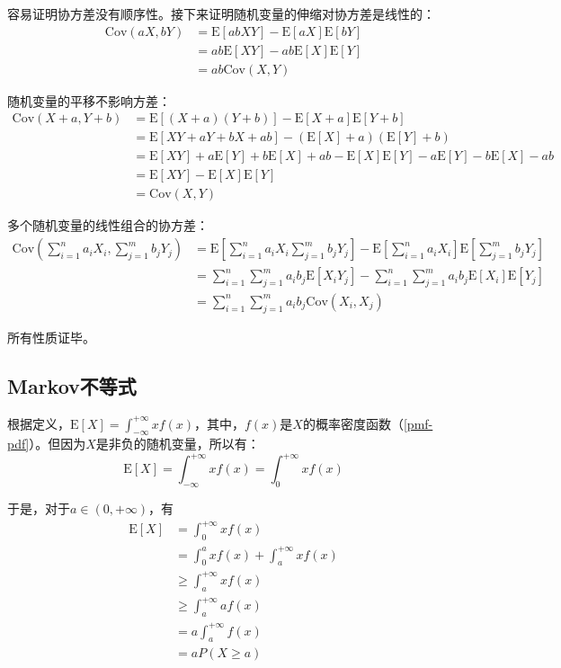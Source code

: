 \documentclass[UTF8]{ctexbook}
\begin{document}
容易证明协方差没有顺序性。接下来证明随机变量的伸缩对协方差是线性的：
\begin{align*}
	\mathrm{Cov}(aX,bY)&=\mathrm E[abXY]-\mathrm E[aX]\mathrm E[bY] \\
	&=ab\mathrm E[XY]-ab\mathrm E[X]\mathrm E[Y] \\
	&=ab\mathrm{Cov}(X, Y)
\end{align*}

随机变量的平移不影响方差：
\begin{align*}
	\mathrm{Cov}(X+a,Y+b)&=\mathrm E[(X+a)(Y+b)]-\mathrm E[X+a]\mathrm E[Y+b] \\
	&=\mathrm E[XY+aY+bX+ab]-(\mathrm E[X]+a)(\mathrm E[Y]+b) \\
	&=\mathrm E[XY]+a\mathrm E[Y]+b\mathrm E[X]+ab-\mathrm E[X]\mathrm E[Y]-a\mathrm E[Y]-b\mathrm E[X]-ab \\
	&=\mathrm E[XY]-\mathrm E[X]\mathrm E[Y] \\
	&=\mathrm{Cov}(X, Y)
\end{align*}

多个随机变量的线性组合的协方差：
\begin{align*}
	\mathrm{Cov}(\sum_{i=1}^na_iX_i, \sum_{j=1}^mb_jY_j)&=\mathrm E[\sum_{i=1}^na_iX_i\sum_{j=1}^mb_jY_j]-\mathrm E[\sum_{i=1}^na_iX_i]\mathrm E[\sum_{j=1}^mb_jY_j] \\
	&=\sum_{i=1}^n\sum_{j=1}^ma_ib_j\mathrm E[X_iY_j]-\sum_{i=1}^n\sum_{j=1}^ma_ib_j\mathrm E[X_i]\mathrm E[Y_j] \\
	&=\sum_{i=1}^n\sum_{j=1}^ma_ib_j\mathrm{Cov}(X_i,X_j)
\end{align*}

所有性质证毕。

\subsection{Markov不等式}
\label{markov-inequality-proof}
根据定义，$\mathrm E[X]=\int_{-\infty}^{+\infty}xf(x)$，其中，$f(x)$是$X$的概率密度函数（\ref{pmf-pdf}）。但因为$X$是非负的随机变量，所以有：
\[
	\mathrm E[X]=\int_{-\infty}^{+\infty}xf(x)=\int_{0}^{+\infty}xf(x)
\]

于是，对于$a\in(0,+\infty)$，有
\begin{align*}
	\mathrm E[X]&=\int_{0}^{+\infty}xf(x) \\
	&=\int_{0}^{a}xf(x)+\int_{a}^{+\infty}xf(x) \\
	&\geq\int_{a}^{+\infty}xf(x) \\
	&\geq\int_{a}^{+\infty}af(x) \\
	&=a\int_{a}^{+\infty}f(x) \\
	&=aP(X\geq a)
\end{align*}
\end{document}
